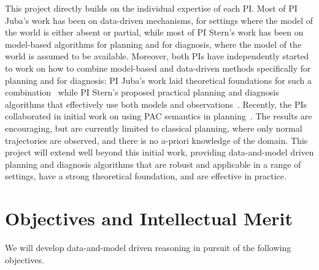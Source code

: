 \documentclass[12pt]{article}
\begin{document}
This project directly builds on the individual expertise of each PI. Most of PI Juba's work has been on data-driven mechanisms, for settings where the model of the world is either absent or partial, while most of PI Stern's work has been on model-based algorithms for planning and for diagnosis, where the model of the world is assumed to be available. Moreover, both PIs have independently started to work on how to combine model-based and data-driven methods specifically for planning and for diagnosis: PI Juba's work laid theoretical foundations for such a combination~\cite{juba2016aaai,juba2016jmlr} while PI Stern's proposed practical planning and diagnosis algorithms that effectively use both models and observations~\cite{elmishali2016dataAugmented,stern2011probably,stern2012search}. 
Recently, the PIs collaborated in initial work on using PAC semantics in planning~\cite{stern2017efficientAndSafe}. 
The results are encouraging, but are currently limited to classical planning, where only normal trajectories are observed, 
and there is no a-priori knowledge of the domain. 
This project will extend well beyond this initial work, providing data-and-model driven planning and diagnosis algorithms that are robust and applicable in a range of settings, have a strong theoretical foundation, and are effective in practice. 
 
 

\section{Objectives and Intellectual Merit}


We will develop data-and-model driven reasoning in pursuit of the following objectives.  
\end{document}
